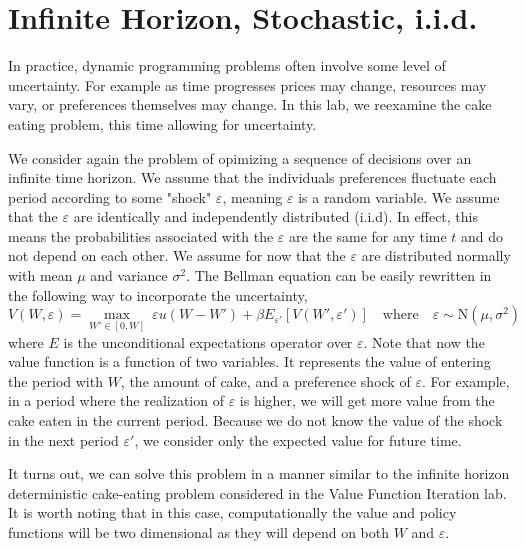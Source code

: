 \newcommand\ve{\varepsilon}


\section{Infinite Horizon, Stochastic, i.i.d.}\label{SecRecProbInfinHorStochiid}

In practice, dynamic programming problems often involve some level of uncertainty.  For example as time progresses prices may change, resources may vary, or preferences themselves may change.  In this lab, we reexamine the cake eating problem, this time allowing for uncertainty.

We consider again the problem of opimizing a sequence of decisions over an infinite time horizon.  We assume that the individuals preferences fluctuate each period according to some "shock" $\ve$, meaning $\ve$ is a random variable.  We assume that the $\ve$ are identically and independently distributed (i.i.d).  In effect, this means the probabilities associated with the $\ve$ are the same for any time $t$ and do not depend on each other.  We assume for now that the $\ve$ are distributed normally with mean $\mu$ and variance $\sigma^2$.  The Bellman equation can be easily rewritten in the following way to incorporate the uncertainty,
\begin{equation*}\label{stoch_Bellman}
   V\left(W,\ve\right) = \max_{W'\in[0,W]}\: \ve u\left(W - W'\right) + \beta E_{\ve'}\left[V\left(W',\ve'\right)\right] \quad\text{where}\quad \ve \sim \text{N}(\mu,\sigma^2)
\end{equation*}
where $E$ is the unconditional expectations operator over $\ve$.  Note that now the value function is a function of two variables.  It represents the value of entering the period with $W$, the amount of cake, and a preference shock of $\ve$.  For example, in a period where the realization of $\ve$ is higher, we will get more value from the cake eaten in the current period.  Because we do not know the value of the shock in the next period $\ve'$, we consider only the expected value for future time.

It turns out, we can solve this problem in a manner similar to the infinite horizon deterministic cake-eating problem considered in the Value Function Iteration lab.  It is worth noting that in this case, computationally the value and policy functions will be two dimensional as they will depend on both $W$ and $\ve$.


